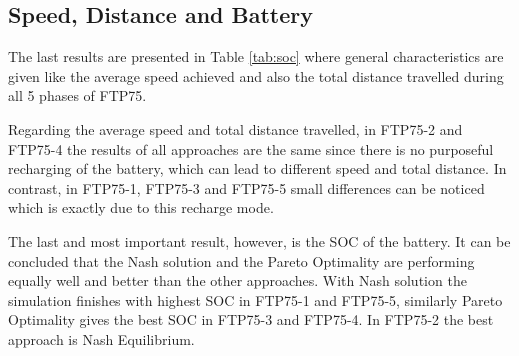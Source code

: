 \subsection{Speed, Distance and Battery}
The last results are presented in Table \ref{tab:soc} where general characteristics are given like the average speed achieved and also the total distance travelled during all 5 phases of FTP75. 

Regarding the average speed and total distance travelled, in FTP75-2 and FTP75-4 the results of all approaches are the same since there is no purposeful recharging of the battery, which can lead to different speed and total distance. In contrast, in FTP75-1, FTP75-3 and FTP75-5 small differences can be noticed which is exactly due to this recharge mode.

The last and most important result, however, is the SOC of the battery. It can be concluded that the Nash solution and the Pareto Optimality are performing equally well and better than the other approaches. With Nash solution the simulation finishes with highest SOC in FTP75-1 and FTP75-5, similarly Pareto Optimality gives the best SOC in FTP75-3 and FTP75-4. In FTP75-2 the best approach is Nash Equilibrium. 


